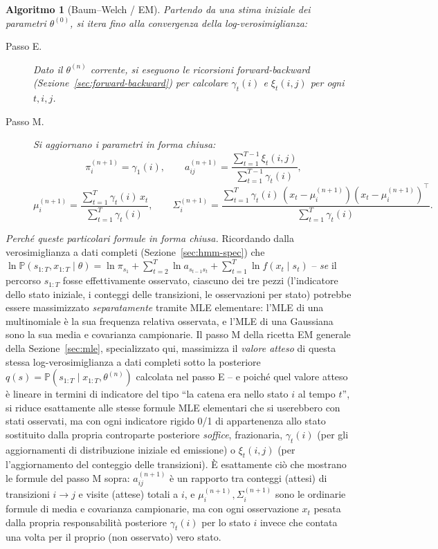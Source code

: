 \documentclass[11pt]{article}
\newtheorem{algorithm}[theorem]{Algoritmo}
\theoremstyle{definition}
\theoremstyle{remark}
\begin{document}
\begin{algorithm}[Baum--Welch / EM]
\label{alg:baumwelch}
Partendo da una stima iniziale dei parametri $\theta^{(0)}$, si itera fino alla convergenza della log-verosimiglianza:
\begin{description}
    \item[Passo E.] Dato il $\theta^{(n)}$ corrente, si eseguono le ricorsioni forward-backward (Sezione~\ref{sec:forward-backward}) per calcolare $\gamma_t(i)$ e $\xi_t(i,j)$ per ogni $t,i,j$.
    \item[Passo M.] Si aggiornano i parametri in forma chiusa:
    \[
    \pi_i^{(n+1)} = \gamma_1(i), \qquad
    a_{ij}^{(n+1)} = \frac{\sum_{t=1}^{T-1}\xi_t(i,j)}{\sum_{t=1}^{T-1}\gamma_t(i)},
    \]
    \[
    \mu_i^{(n+1)} = \frac{\sum_{t=1}^{T}\gamma_t(i)\,x_t}{\sum_{t=1}^{T}\gamma_t(i)}, \qquad
    \Sigma_i^{(n+1)} = \frac{\sum_{t=1}^{T}\gamma_t(i)\,(x_t-\mu_i^{(n+1)})(x_t-\mu_i^{(n+1)})^\top}{\sum_{t=1}^{T}\gamma_t(i)}.
    \]
\end{description}
\end{algorithm}
\emph{Perch\'e queste particolari formule in forma chiusa.} Ricordando dalla verosimiglianza a dati completi (Sezione~\ref{sec:hmm-spec}) che $\ln\mathbb{P}(s_{1:T},x_{1:T}\mid\theta)=\ln\pi_{s_1}+\sum_{t=2}^T\ln a_{s_{t-1}s_t}+\sum_{t=1}^T\ln f(x_t\mid s_t)$ -- \emph{se} il percorso $s_{1:T}$ fosse effettivamente osservato, ciascuno dei tre pezzi (l'indicatore dello stato iniziale, i conteggi delle transizioni, le osservazioni per stato) potrebbe essere massimizzato \emph{separatamente} tramite MLE elementare: l'MLE di una multinomiale \`e la sua frequenza relativa osservata, e l'MLE di una Gaussiana sono la sua media e covarianza campionarie. Il passo M della ricetta EM generale della Sezione~\ref{sec:mle}, specializzato qui, massimizza il \emph{valore atteso} di questa stessa log-verosimiglianza a dati completi sotto la posteriore $q(s)=\mathbb{P}(s_{1:T}\mid x_{1:T},\theta^{(n)})$ calcolata nel passo E -- e poich\'e quel valore atteso \`e lineare in termini di indicatore del tipo ``la catena era nello stato $i$ al tempo $t$'', si riduce esattamente alle stesse formule MLE elementari che si userebbero con stati osservati, ma con ogni indicatore rigido 0/1 di appartenenza allo stato sostituito dalla propria controparte posteriore \emph{soffice}, frazionaria, $\gamma_t(i)$ (per gli aggiornamenti di distribuzione iniziale ed emissione) o $\xi_t(i,j)$ (per l'aggiornamento del conteggio delle transizioni). \`E esattamente ci\`o che mostrano le formule del passo M sopra: $a_{ij}^{(n+1)}$ \`e un rapporto tra conteggi (attesi) di transizioni $i\to j$ e visite (attese) totali a $i$, e $\mu_i^{(n+1)},\Sigma_i^{(n+1)}$ sono le ordinarie formule di media e covarianza campionarie, ma con ogni osservazione $x_t$ pesata dalla propria responsabilit\`a posteriore $\gamma_t(i)$ per lo stato $i$ invece che contata una volta per il proprio (non osservato) vero stato.
\end{document}
